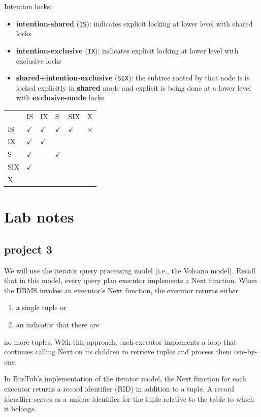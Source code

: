 \documentclass[11pt]{article}
\begin{document}
Intention locks:
\begin{itemize}
\item \textbf{intention-shared} (\texttt{IS}): indicates explicit locking at lower level with shared locks
\item \textbf{intention-exclusive} (\texttt{IX}): indicates explicit locking at lower level with exclusive locks
\item \textbf{shared+intention-exclusive} (\texttt{SIX}): the subtree rooted by that node is is locked explicitly in
\textbf{shared} mode and explicit is being done at a lower level with \textbf{exclusive-mode} locks
\end{itemize}

\begin{center}
\begin{tabular}{llllll}
 & IS & IX & S & SIX & X\\
IS & \(\checkmark\) & \(\checkmark\) & \(\checkmark\) & \(\checkmark\) & \(\times\)\\
IX & \(\checkmark\) & \(\checkmark\) &  &  & \\
S & \(\checkmark\) &  & \(\checkmark\) &  & \\
SIX & \(\checkmark\) &  &  &  & \\
X &  &  &  &  & \\
\end{tabular}
\end{center}
\section{Lab notes}
\label{sec:org97a8330}
\subsection{project 3}
\label{sec:org085e4c7}
We will use the iterator query processing model (i.e., the Volcano model). Recall that in this
model, every query plan executor implements a Next function. When the DBMS invokes an executor's
Next function, the executor returns either
\begin{enumerate}
\item a single tuple or
\item an indicator that there are
\end{enumerate}
no more tuples. With this approach, each executor implements a loop that continues calling Next
on its children to retrieve tuples and process them one-by-one.

In BusTub's implementation of the iterator model, the Next function for each executor returns a
record identifier (RID) in addition to a tuple. A record identifier serves as a unique
identifier for the tuple relative to the table to which it belongs.
\end{document}
